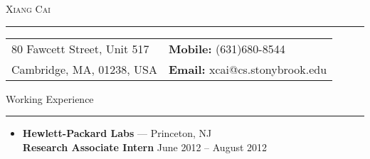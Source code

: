 \documentclass[11pt,oneside]{article}
\makeatletter
\newcommand{\name}{Xiang Cai\xspace}
\newcommand{\addrlinea}{80 Fawcett Street, Unit 517\xspace}
\newcommand{\addrlineb}{Cambridge, MA, 01238, USA\xspace}
\newcommand{\phone}{\hfill \textbf{Mobile: }(631)680-8544\xspace}
\newcommand{\email}{\hfill \textbf{Email: }xcai@cs.stonybrook.edu\xspace}
\newcommand{\bigname}[1]{
	\begin{center}\fontfamily{phv}\selectfont\Huge\scshape#1\end{center}
}
\newcommand{\contact}[1]{
	\begin{flushleft}\fontfamily{phv}\selectfont\Huge\Large#1\end{flushleft}
}
\newenvironment{ressection}[1]{
	{\fontfamily{phv}\selectfont\Large#1}
	
	\vspace{-8pt} \rule{\textwidth}{.5pt}
	
	\vspace{-4pt}
	\begin{itemize}
	\vspace{.5pt}
}{
	\end{itemize}
}
\newcommand{\resitem}[1]{
	\vspace{2pt}
	\item \begin{flushleft} #1 \end{flushleft}
}
\newcommand{\resbigitem}[3]{
	\vspace{-5pt}
	\item
	\textbf{#1} --- #2 \\
	{#3}
}
\newenvironment{ressubsec}[3]{
	\resbigitem{#1}{#2}{#3}
	\vspace{-4pt}
	\begin{itemize}
}{
	\end{itemize}
}
\newenvironment{ressubsec_empty}[3]{
	\resbigitem{#1}{#2}{#3}
	\vspace{-2pt}
}
\makeatother
\begin{document}
\bigname{\name}

\vspace{-8pt} \rule{\textwidth}{1pt}



\vspace{-6pt}
\begin{table}[h]
\begin{tabular}[h]{p{}p{}}
\addrlinea & \phone \\
\addrlineb & \email \\
\end{tabular}
\end{table}

\vspace{-4pt}




\begin{ressection}{Working Experience}
	\begin{ressubsec_empty}{Twitter Inc.}{Cambridge, MA}{\textbf{Software Engineer II} \hfill September 2014 -- present}
		\vspace{-2pt}
	\end{ressubsec_empty}
	
	\begin{ressubsec}{Hewlett-Packard Labs}{Princeton, NJ}{\textbf{Research Associate Intern} \hfill June 2012 -- August 2012}
		\vspace{-2pt}
	\end{ressubsec}
\end{ressection}
\end{document}
